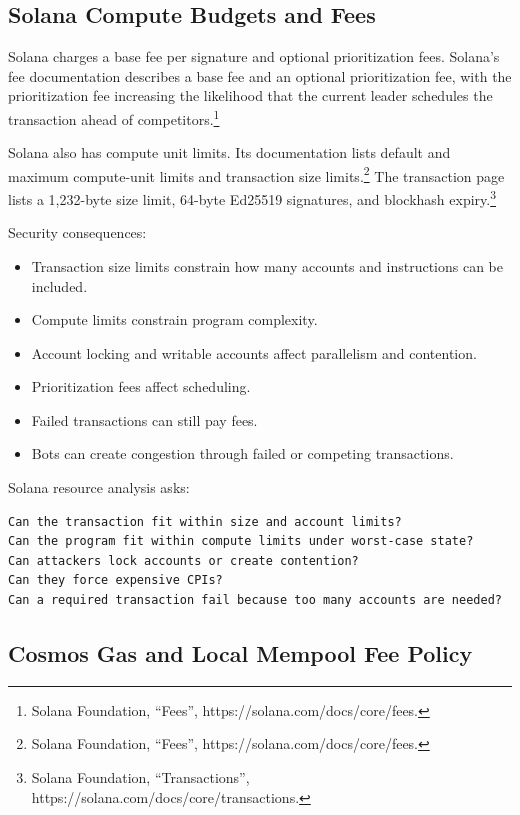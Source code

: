 \subsection{Solana Compute Budgets and Fees}

Solana charges a base fee per signature and optional prioritization
fees. Solana's fee documentation describes a base fee and an optional
prioritization fee, with the prioritization fee increasing the
likelihood that the current leader schedules the transaction ahead of
competitors.\footnote{Solana Foundation, ``Fees'',
  https://solana.com/docs/core/fees.}

Solana also has compute unit limits. Its documentation lists default and
maximum compute-unit limits and transaction size limits.\footnote{Solana
  Foundation, ``Fees'', https://solana.com/docs/core/fees.} The
transaction page lists a 1,232-byte size limit, 64-byte Ed25519
signatures, and blockhash expiry.\footnote{Solana Foundation,
  ``Transactions'', https://solana.com/docs/core/transactions.}

Security consequences:

\begin{itemize}
\tightlist
\item
  Transaction size limits constrain how many accounts and instructions
  can be included.
\item
  Compute limits constrain program complexity.
\item
  Account locking and writable accounts affect parallelism and
  contention.
\item
  Prioritization fees affect scheduling.
\item
  Failed transactions can still pay fees.
\item
  Bots can create congestion through failed or competing transactions.
\end{itemize}

Solana resource analysis asks:

\begin{lstlisting}
Can the transaction fit within size and account limits?
Can the program fit within compute limits under worst-case state?
Can attackers lock accounts or create contention?
Can they force expensive CPIs?
Can a required transaction fail because too many accounts are needed?
\end{lstlisting}

\subsection{Cosmos Gas and Local Mempool Fee Policy}

